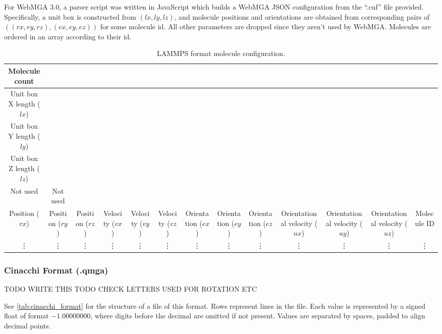 For WebMGA 3.0, a parser script was written in JavaScript which builds a WebMGA JSON configuration from the ``.cnf'' file provided. Specifically, a unit box is constructed from $(lx, ly, lz)$, and molecule positions and orientations are obtained from corresponding pairs of $((rx,ry,rz),(ex,ey,ez))$ for some molecule id. All other parameters are dropped since they aren't used by WebMGA. Molecules are ordered in an array according to their id.
\begin{table}
  \begin{center}
  \begin{adjustbox}{width=\textwidth}
    \begin{tabular}{|c|c|c|c|c|c|c|c|c|c|c|c|c|}
      \hline
      Molecule count & & & & & & & & & & & &\\
      \hline
      Unit box X length ($lx$) & & & & & & & & & & & &\\
      \hline
      Unit box Y length ($ly$) & & & & & & & & & & & &\\
      \hline
      Unit box Z length ($lz$) & & & & & & & & & & & &\\
      \hline
      Not used & Not used & & & & & & & & & & &\\
      \hline
      Position ($rx$) & Position ($ry$) & Position ($rz$) & Velocity ($vx$) & Velocity ($vy$) & Velocity ($vz$) & Orientation ($ex$) & Orientation ($ey$) & Orientation ($ez$) & Orientational velocity ($ux$) & Orientational velocity ($uy$) & Orientational velocity ($uz$) & Molecule ID\\
      \hline
      \vdots & \vdots & \vdots & \vdots & \vdots & \vdots & \vdots & \vdots & \vdots & \vdots & \vdots & \vdots & \vdots \\
       \hline
    \end{tabular}
  \end{adjustbox}
  \end{center}
  \caption{LAMMPS format molecule configuration.}
  \label{tab:lammps_format}
\end{table}

\subsubsection{Cinacchi Format (.qmga)}
TODO WRITE THIS
TODO CHECK LETTERS USED FOR ROTATION ETC

See \cref{tab:cinacchi_format} for the structure of a file of this format. Rows represent lines in the file. Each value is represented by a signed float of format $-1.00000000$, where digits before the decimal are omitted if not present. Values are separated by spaces, padded to align decimal points.

